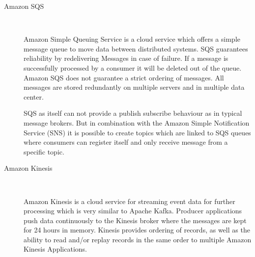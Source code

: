 \begin{description}
    \item [Amazon SQS] \hfill \\
    {
    Amazon Simple Queuing Service is a cloud service which offers a simple
    message queue to move data between distributed systems. SQS guarantees
    reliability by redelivering Messages in case of failure. If a message is
    successfully processed by a consumer it will be deleted out of the queue.
    Amazon SQS does not guarantee a strict ordering of messages. All messages
    are stored redundantly on multiple servers and in multiple data center.
    \cite{amazonSQS} \cite{amazonSQSFaq} 

    SQS as itself can not provide a publish subscribe behaviour as in typical
    message brokers. But in combination with the Amazon Simple  Notification
    Service (SNS) it is possible to create topics which are linked to SQS queues
    where consumers can register itself and only receive message from a specific
    topic. \cite{amazonSqsPubSub}
     }
    \item [Amazon Kinesis] \hfill \\
    { 
    Amazon Kinesis is a cloud service for streaming event
    data for further processing which is very similar to Apache Kafka. Producer
    applications push data continuously to the Kinesis broker where the messages
    are kept for 24 hours in memory. Kinesis provides ordering of records, as
    well as the ability to read and/or replay records in the same order to
    multiple Amazon Kinesis Applications.
    \cite{amazonKinesis} \cite{amazonKinesisFAQ} 
    
}
\end{description}
